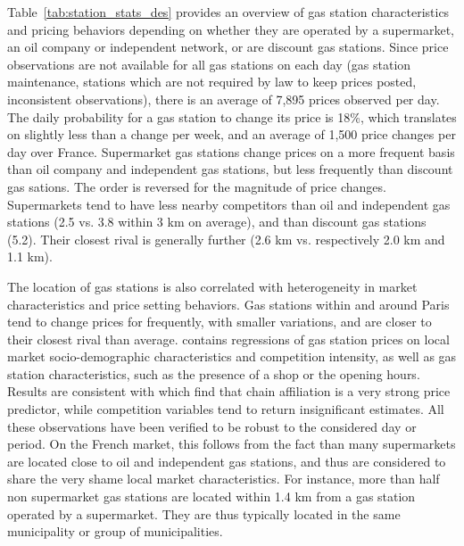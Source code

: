 \documentclass[english]{article}
\begin{document}
Table~\ref{tab:station_stats_des} provides an overview of gas station characteristics and pricing behaviors depending on whether they are operated by a supermarket, an oil company or independent network, or are discount gas stations. Since price observations are not available for all gas stations on each day (gas station maintenance, stations which are not required by law to keep prices posted, inconsistent observations), there is an average of 7,895 prices observed per day. The daily probability for a gas station to change its price is 18\%, which translates on slightly less than a change per week, and an average of 1,500 price changes per day over France. Supermarket gas stations change prices on a more frequent basis than oil company and independent gas stations, but less frequently than discount gas sations. The order is reversed for the magnitude of price changes. Supermarkets tend to have less nearby competitors than oil and independent gas stations (2.5 vs. 3.8 within 3 km on average), and than discount gas stations (5.2). Their closest rival is generally further (2.6 km vs. respectively 2.0 km and 1.1 km).

The location of gas stations is also correlated with heterogeneity in market characteristics and price setting behaviors. Gas stations within and around Paris tend to change prices for frequently, with smaller variations, and are closer to their closest rival than average. \cite{CHA16} contains regressions of gas station prices on local market socio-demographic characteristics and competition intensity, as well as gas station characteristics, such as the presence of a shop or the opening hours. Results are consistent with \cite{HOS08} which find that chain affiliation is a very strong price predictor, while competition variables tend to return insignificant estimates. All these observations have been verified to be robust to the considered day or period. On the French market, this follows from the fact than many supermarkets are located close to oil and independent gas stations, and thus are considered to share the very shame local market characteristics. For instance, more than half non supermarket gas stations are located within 1.4 km from a gas station operated by a supermarket. They are thus typically located in the same municipality or group of municipalities.
\end{document}
